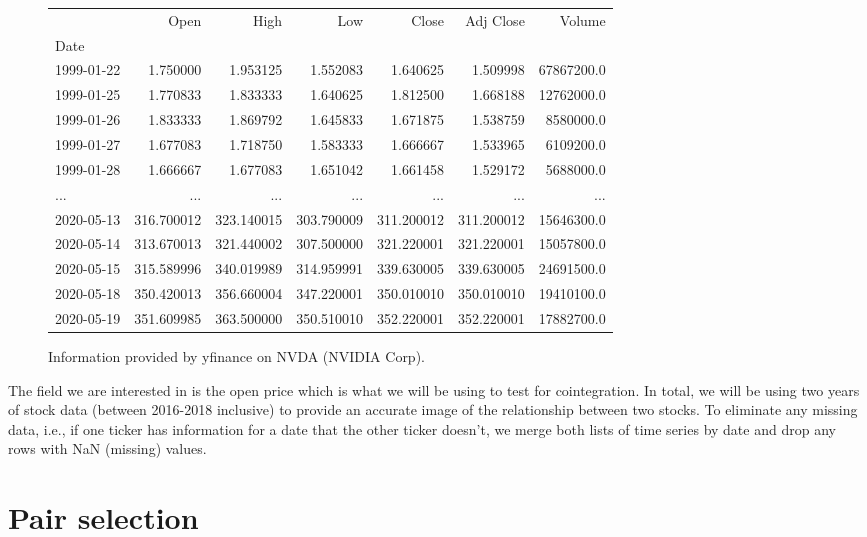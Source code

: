 \documentclass{UoYCSproject}
\begin{document}
\begin{figure}[h]
\begin{center}
\begin{adjustbox}{max width=\textwidth}
\begin{tabular}{lrrrrrr} & Open & High & Low & Close & Adj Close & Volume\\Date & & & & & &\\1999-01-22 & 1.750000 & 1.953125 & 1.552083 & 1.640625 &  1.509998 & 67867200.0 \\1999-01-25 & 1.770833 & 1.833333 & 1.640625 & 1.812500 &  1.668188 & 12762000.0 \\1999-01-26 & 1.833333 & 1.869792 & 1.645833 & 1.671875 &  1.538759 &  8580000.0 \\1999-01-27 & 1.677083 & 1.718750 & 1.583333 & 1.666667 &  1.533965 &  6109200.0 \\1999-01-28 & 1.666667 & 1.677083 & 1.651042 & 1.661458 &  1.529172 &  5688000.0\\... & ... & ... & ... & ... & ... & ...\\2020-05-13 & 316.700012 & 323.140015 & 303.790009 & 311.200012 & 311.200012 & 15646300.0\\2020-05-14 & 313.670013 & 321.440002 & 307.500000 & 321.220001 & 321.220001 & 15057800.0 \\2020-05-15 & 315.589996 & 340.019989 & 314.959991 & 339.630005 & 339.630005 & 24691500.0 \\2020-05-18 & 350.420013 & 356.660004 & 347.220001 & 350.010010 & 350.010010 & 19410100.0 \\2020-05-19 & 351.609985 & 363.500000 & 350.510010 & 352.220001 & 352.220001 & 17882700.0\\
\end{tabular}
\end{adjustbox}
\end{center}
\caption{Information provided by yfinance on NVDA (NVIDIA Corp).}
\end{figure}

The field we are interested in is the open price which is what we will be using to test for cointegration. In total, we will be using two years of stock data (between 2016-2018 inclusive) to provide an accurate image of the relationship between two stocks. To eliminate any missing data, i.e., if one ticker has information for a date that the other ticker doesn't, we merge both lists of time series by date and drop any rows with NaN (missing) values.

\section{Pair selection}
\end{document}
